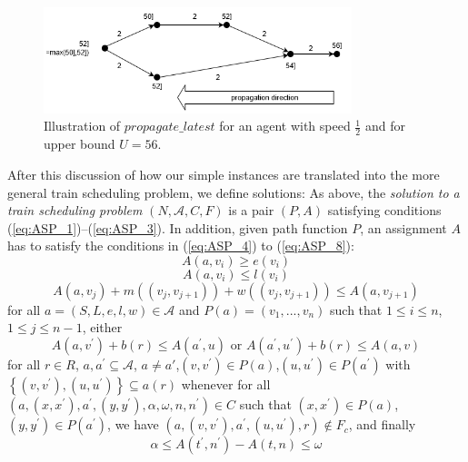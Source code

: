 \documentclass{article}
\begin{document}
\begin{figure}[hbtp]
	\centering
  \includegraphics[width=0.8\textwidth]{H1_propagate_latest.png}
	\caption{Illustration of $propagate\_latest$ for an agent with speed $\frac{1}{2}$ and for upper bound $U=56$.}
	\label{fig:propagate_latest}
\end{figure}



After this discussion of how our simple instances are translated into the more general train scheduling problem, we define solutions:
As above, the \emph{solution to a train scheduling problem} $(N, \mathcal{A}, C, F)$ is a pair $(P,A)$
satisfying conditions (\ref{eq:ASP_1})--(\ref{eq:ASP_3}).
In addition, given path function $P$, an assignment $A$ has to satisfy the conditions in (\ref{eq:ASP_4}) to (\ref{eq:ASP_8}):
\begin{equation}
A(a, v_i)\geq e(v_i)\label{eq:ASP_4}
\end{equation}
\begin{equation}
A(a, v_i)\leq l(v_i)\label{eq:ASP_5}
\end{equation}
\begin{equation}
A(a, v_j) +m((v_j, v_{j+1})) +w((v_j, v_{j+1}))\leq A(a, v_{j+1})\label{eq:ASP_6}
\end{equation}
for all $a= (S, L, e, l, w)\in\mathcal{A}$ and $P(a) = (v_1, . . . , v_n)$ such that $1\leq i\leq n$,$1\leq j\leq n-1$,
either
\begin{equation}
A(a, v^\prime) +b(r) \leq A(a^\prime, u) \textrm{ or }A(a^\prime, u^\prime) +b(r)\leq A(a, v) \label{eq:ASP_7}
\end{equation}
for all $r\in R$, ${a, a^\prime} \subseteq \mathcal{A}$, $a\not=a'$,$(v, v^\prime)\in P(a)$,$(u, u^\prime)\in P(a^\prime)$ with $\left\{(v, v^\prime),(u, u^\prime)\right\} \subseteq a(r)$ whenever for all $(a,(x, x^\prime), a^\prime,(y, y^\prime), \alpha, \omega, n, n^\prime)\in C$ such that $(x, x^\prime)\in P(a)$,$(y, y^\prime)\in P(a^\prime)$, we have $(a,(v, v^\prime), a^\prime,(u, u^\prime), r)\not\in F_c$, and finally
\begin{equation}
\alpha\leq A(t^\prime, n^\prime)-A(t, n)\leq \omega\label{eq:ASP_8}
\end{equation}
\end{document}
